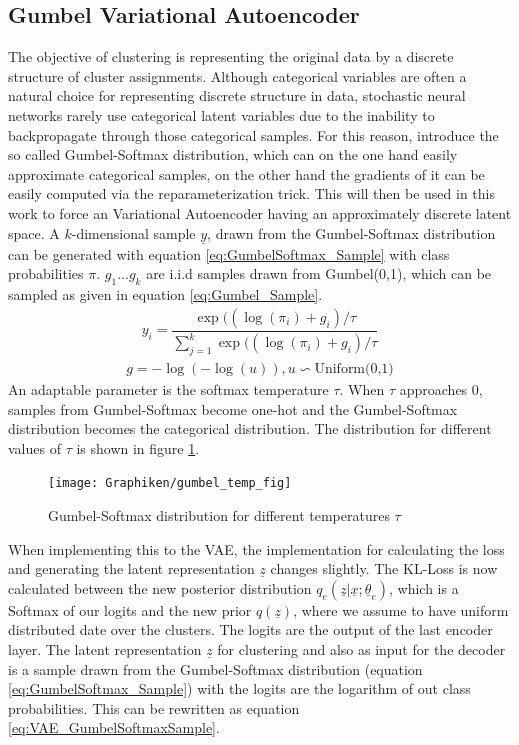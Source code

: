 \documentclass[12pt,DIV14,BCOR12mm,a4paper,footexclude,headinclude,halfparskip-,twoside,openright,openany,cleardoubleempty,idxtotoc,bibtotoc]{scrreprt} %
\numberwithin{equation}{chapter}
\begin{document}
\subsection{Gumbel Variational Autoencoder}
The objective of clustering is representing the original data by a discrete structure of cluster assignments. Although categorical variables are often a natural choice for representing discrete structure in data, stochastic neural networks rarely use categorical latent variables due to the inability to backpropagate through those categorical samples. For this reason, \cite{Jang17GumbelVAE} introduce the so called Gumbel-Softmax distribution, which can on the one hand easily approximate categorical samples, on the other hand the gradients of it can be easily computed via the reparameterization trick. This will then be used in this work to force an Variational Autoencoder having an approximately discrete latent space. A $k$-dimensional sample $\underline{y}$, drawn from the Gumbel-Softmax distribution can be generated with equation \ref{eq:GumbelSoftmax_Sample} with class probabilities $\pi$. $g_1...g_k$ are i.i.d samples drawn from Gumbel(0,1), which can be sampled as given in equation \ref{eq:Gumbel_Sample}.
\begin{align}
	y_i = \dfrac{\exp((\log(\pi_i)+g_i)/\tau}{\sum_{j=1}^{k}\exp((\log(\pi_i)+g_i)/\tau}\label{eq:GumbelSoftmax_Sample}
\end{align}
\begin{align}
	g = -\log(-\log(u)), u \backsim \textrm{Uniform(0,1)}\label{eq:Gumbel_Sample}
\end{align}
An adaptable parameter is the softmax temperature $\tau$. When $\tau$ approaches $0$, samples from Gumbel-Softmax become one-hot and the Gumbel-Softmax distribution becomes the categorical distribution. The distribution for different values of $\tau$ is shown in figure \ref{fig:Gumbel-Softmax_Distr}.
\begin{figure}[htb!]
	\centering
	\texttt{[image: Graphiken/gumbel\_temp\_fig]}
	\caption{Gumbel-Softmax distribution for different temperatures $\tau$ \cite{Jang17GumbelVAE}}
	\label{fig:Gumbel-Softmax_Distr}
\end{figure}
When implementing this to the VAE, the implementation for calculating the loss and generating the latent representation $\underline{z}$ changes slightly. The KL-Loss is now calculated between the new posterior distribution $q_e(\underline{z}|\underline{x};\underline{\theta}_e)$, which is a Softmax of our logits and the new prior $q(\underline{z})$, where we assume to have uniform distributed date over the clusters. The logits are the output of the last encoder layer. The latent representation $\underline{z}$ for clustering and also as input for the decoder is a sample drawn from the Gumbel-Softmax distribution (equation \ref{eq:GumbelSoftmax_Sample}) with the logits are the logarithm of out class probabilities. This can be rewritten as equation \ref{eq:VAE_GumbelSoftmaxSample}.
\end{document}
